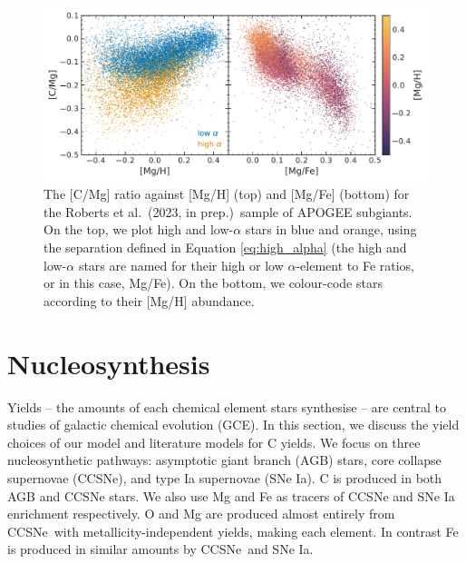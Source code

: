\documentclass[fleqn,usenatbib]{mnras}
\newcommand{\citetjack}{Roberts et al.~(2023, in prep.)}
\newcommand{\cc}{CCSNe}
\newcommand{\agb}{AGB}
\newcommand{\ia}{SNe Ia}
\newcommand{\apogee}{APOGEE}
\begin{document}


\begin{figure}
    \centering
    \includegraphics{subgiants.pdf}
    \caption[Subgiant Abundances]{The [C/Mg] ratio against [Mg/H] (top) and [Mg/Fe] (bottom) for the \citetjack~sample of \apogee{} subgiants. On the top, we plot high and low-$\alpha$ stars in blue and orange, using the separation defined in Equation \ref{eq:high_alpha} (the high and low-$\alpha$ stars are named for their high or low $\alpha$-element to Fe ratios, or in this case, Mg/Fe). On the bottom, we colour-code stars according to their [Mg/H] abundance.} \label{fig:subgiants}
\end{figure}








\section{Nucleosynthesis}

Yields -- the amounts of each chemical element stars synthesise -- are central to studies of galactic chemical evolution (GCE). 
In this section, we discuss the yield choices of our model and literature models for C yields. 
We focus on three nucleosynthetic pathways: asymptotic giant branch (\agb{}) stars, core collapse supernovae (\cc{}), and type Ia supernovae (\ia{}).
C is produced in both \agb{} and \cc{} stars.
We also use Mg and Fe as tracers of \cc{} and \ia{} enrichment respectively. 
O and Mg are produced almost entirely from \cc\ with metallicity-independent yields, making each element. In contrast Fe is produced in similar amounts by \cc\ and \ia.
\end{document}
